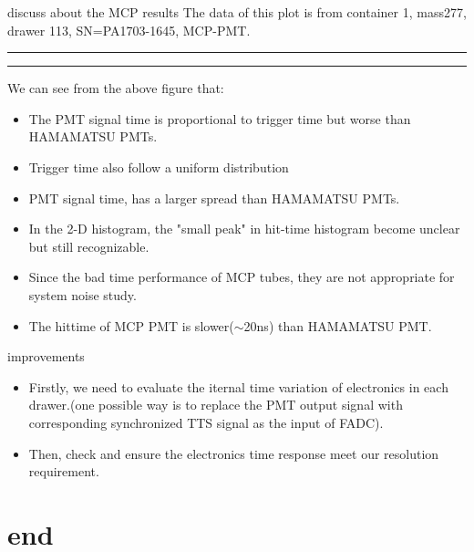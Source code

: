 \documentclass[11pt,compress,xcolor=x11names,UTF8]{beamer}
\begin{document}
\begin{frame}{discuss about the MCP results}
The data of this plot is from container 1, mass277, drawer 113, SN=PA1703-1645, MCP-PMT.\\
\vspace{.5cm}
\hrule{}
\hrule{}
\vspace{.5cm}
We can see from the above figure that:
\begin{itemize}
\item The PMT signal time is proportional to trigger time but worse than HAMAMATSU PMTs.
\item Trigger time also follow a uniform distribution 
\item PMT signal time, has a larger spread than HAMAMATSU PMTs.
\item In the 2-D histogram, the "small peak" in hit-time histogram become unclear but still recognizable.
\item Since the bad time performance of MCP tubes, they are not appropriate for system noise study.
\item The hittime of MCP PMT is slower($\sim $20ns) than HAMAMATSU PMT.
\end{itemize}
\end{frame}

\begin{frame}{improvements}
\begin{itemize}
\item Firstly, we need to evaluate the iternal time variation of electronics in each drawer.(one possible way is to replace the PMT output signal with corresponding synchronized TTS signal as the input of FADC).

\item Then, check and ensure the electronics time response meet our resolution requirement.

\end{itemize}
\end{frame}

\section{end}

\begin{frame}

\end{frame}


%
%
\end{document}
